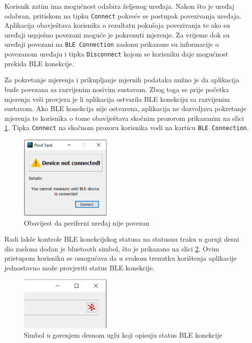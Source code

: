 \documentclass[../diplomski_rad.tex]{subfiles}
\begin{document}
Korisnik zatim ima mogućnost odabira željenog uređaja. Nakon što je uređaj odabran, pritiskom na tipku \texttt{Connect} 
pokreće se postupak povezivanja uređaja. 
Aplikacija obavještava korisnika o rezultatu pokušaja povezivanja te ako su uređaji uspješno povezani moguće je pokrenuti mjerenje.  
Za vrijeme dok su uređaji povezani na \texttt{BLE Connection} zaslonu prikazane su informacije o povezanom uređaju 
i tipka \texttt{Disconnect} kojom se korisniku daje mogućnost prekida BLE konekcije.

Za pokretanje mjerenja i prikupljanje mjernih podataka nužno je da aplikacija bude povezana sa razvijenim nosivim sustavom. 
Zbog toga se prije početka mjerenja vrši provjera je li aplikacija ostvarila BLE konekciju sa razvijenim sustavom. 
Ako BLE konekcija nije ostvarena, aplikacija ne dozvoljava pokretanje mjerenja te korisnika o tome obaviještava 
skočnim prozorom prikazanim na slici \ref{slk:ble_not_connected}. Tipka \texttt{Connect} na skočnom prozoru korisnika 
vodi na karticu \texttt{BLE Connection}.

\begin{figure}[htb]
    \centering
    \includegraphics[width=0.4\textwidth]{Figures/ble_not_connected.png} 
    \caption{Obavijest da periferni uređaj nije povezan}
    \label{slk:ble_not_connected}
\end{figure}

Radi lakše kontrole BLE konekcijskog statusa na statusnu traku u gornji desni dio zaslona dodan je bluetooth simbol, 
što je prikazano na slici \ref{slk:ble_status}.  
Ovim pristupom korisniku se omogućava da u svakom trenutku korištenja aplikacije jednostavno može provjeriti status BLE konekcije. 

\begin{figure}[htb]
    \centering
    \includegraphics[width=0.4\textwidth]{Figures/cosak.png} 
    \caption{Simbol u gorenjem desnom uglu koji opisuju status BLE konekcije}
    \label{slk:ble_status}
\end{figure}
\end{document}
